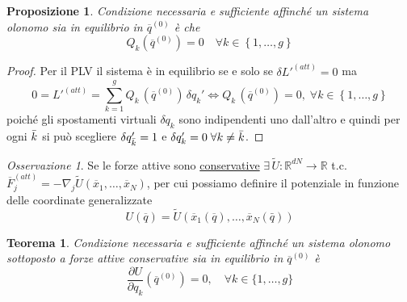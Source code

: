\documentclass{book}
\theoremstyle{plain}
\newtheorem{teo}{Teorema}[chapter]
\theoremstyle{plain}
\theoremstyle{plain}
\theoremstyle{plain}
\theoremstyle{plain}
\newtheorem{prop}{Proposizione}[chapter]
\theoremstyle{definition}
\theoremstyle{remark}
\newtheorem*{oss}{Osservazione}
\theoremstyle{definition}
\begin{document}
\begin{prop}
    Condizione necessaria e sufficiente affinché un sistema olonomo sia in equilibrio in $\overline{q}^{(0)}$ è che 
    \begin{displaymath}
        Q_{k}\left(\overline{q}^{(0)}\right)=0 \quad \forall k \in \left\{1, \ldots, g\right\} 
    \end{displaymath}
\end{prop}

\begin{proof}
    Per il PLV il sistema è in equilibrio se e solo se $\delta L'^{(att)}=0$ ma
    \begin{displaymath}
        0=L'^{(att)}=\sum_{k=1}^g Q_k\,(\overline{q}^{(0)})\,\delta q_k'\iff Q_k\,(\overline{q}^{(0)})=0,\; \forall k \in \left\{1, \ldots, g\right\}
    \end{displaymath}
    poiché gli spostamenti virtuali $\delta q_k$ sono indipendenti uno dall'altro e quindi per ogni $\Bar{k}$ si può scegliere $\delta q_{\Bar{k}}'=1$ e $\delta q_k'=0 \; \forall k\neq\Bar{k}$. 
\end{proof}

\begin{oss}
    Se le forze attive sono \underline{conservative} $\exists \, \widetilde{U}: \mathbb{R}^{dN} \to \mathbb{R}$ t.c. $\overline{F}_{j}^{(att)}=-\nabla_{j} \widetilde{U}\left(\overline{x}_{1}, \ldots, \overline{x}_{N}\right)$, per cui possiamo definire il potenziale in funzione delle coordinate generalizzate
    \begin{displaymath}
    \boxed{
        U\left(\overline{q}\right)=\widetilde{U}\left(\overline{x}_{1}\left(\overline{q}\right), \ldots, \overline{x}_{N}\left(\bar{q}\right)\right)
        }
    \end{displaymath}
\end{oss}

\begin{teo}
    Condizione necessaria e sufficiente affinché un sistema olonomo sottoposto a forze attive conservative sia in equilibrio in $\overline{q}^{(0)}$ è
    \begin{displaymath}
    \boxed{
        \frac{\partial U}{\partial q_{k}}\left(\overline{q}^{(0)}\right)=0, \quad \forall k \in \{1, \ldots, g\}
        }
    \end{displaymath}
\end{teo}
\end{document}
